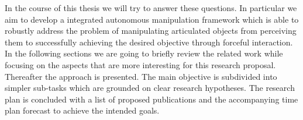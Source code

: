 In the course of this thesis we will try to answer these questions. In particular we aim to develop a integrated autonomous manipulation framework which is able to robustly address the problem of manipulating articulated objects from perceiving them to successfully achieving the desired objective through forceful interaction. In the following sections we are going to briefly review the related work while focusing on the aspects that are more interesting for this research proposal. Thereafter the approach is presented. The main objective is subdivided into simpler sub-tasks which are grounded on clear research hypotheses. The research plan is concluded with a list of proposed publications and the accompanying time plan forecast to achieve the intended goals. 
